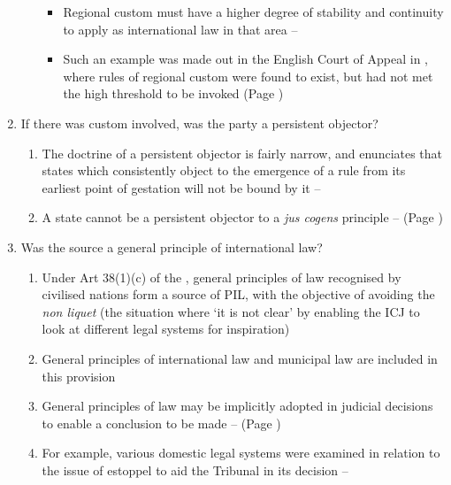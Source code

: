 \begin{enumerate}
\begin{enumerate}
        \begin{itemize}
            \item Regional custom must have a higher degree of stability and continuity to apply as international law in that area -- 
            \item Such an example was made out in the English Court of Appeal in , where rules of regional custom were found to exist, but had not met the high threshold to be invoked (Page \pageref{case:R (Al-Saadoon v Sec. of Defence)})
        \end{itemize}
    \end{enumerate}
    \item If there was custom involved, was the party a persistent objector?
    \begin{enumerate}
        \item The doctrine of a persistent objector is fairly narrow, and enunciates that states which consistently object to the emergence of a rule from its earliest point of gestation will not be bound by it -- 
        \item A state cannot be a persistent objector to a \textit{jus cogens} principle --  (Page \pageref{report:2019 ILC Conc. 14})
    \end{enumerate}
    \item Was the source a general principle of international law?
    \begin{enumerate}
        \item Under Art 38(1)(c) of the , general principles of law recognised by civilised nations form a source of PIL, with the objective of avoiding the \textit{non liquet} (the situation where `it is not clear' by enabling the ICJ to look at different legal systems for inspiration)
        \item General principles of international law and municipal law are included in this provision
        \item General principles of law may be implicitly adopted in judicial decisions to enable a conclusion to be made --  (Page \pageref{case:Bangladesh v Myanmar})
        \item For example, various domestic legal systems were examined in relation to the issue of estoppel to aid the Tribunal in its decision -- 

\end{enumerate}
\end{enumerate}
